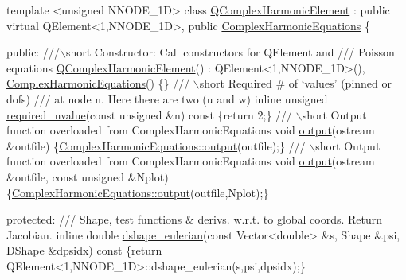 \begin{DoxyCodeInclude}
\textcolor{keyword}{template} <\textcolor{keywordtype}{unsigned} NNODE\_1D>
\textcolor{keyword}{class }\hyperlink{classQComplexHarmonicElement}{QComplexHarmonicElement} : \textcolor{keyword}{public} \textcolor{keyword}{virtual} QElement<1,NNODE\_1D>, 
                         \textcolor{keyword}{public} \hyperlink{classComplexHarmonicEquations}{ComplexHarmonicEquations}
\{
 
  \textcolor{keyword}{public}:
\textcolor{comment}{}
\textcolor{comment}{ ///\(\backslash\)short  Constructor: Call constructors for QElement and }
\textcolor{comment}{ /// Poisson equations}
\textcolor{comment}{} \hyperlink{classQComplexHarmonicElement_a9f1e88c4b5c7031d77c6f6dd3758de2a}{QComplexHarmonicElement}() : QElement<1,NNODE\_1D>(), 
                             \hyperlink{classComplexHarmonicEquations}{ComplexHarmonicEquations}() \{\}
\textcolor{comment}{}
\textcolor{comment}{ /// \(\backslash\)short  Required  # of `values' (pinned or dofs) }
\textcolor{comment}{ /// at node n. Here there are two (u and w)}
\textcolor{comment}{} \textcolor{keyword}{inline} \textcolor{keywordtype}{unsigned} \hyperlink{classQComplexHarmonicElement_a3f1d68324e9d8b9e143044d716c72a87}{required\_nvalue}(\textcolor{keyword}{const} \textcolor{keywordtype}{unsigned} &n)\textcolor{keyword}{ const }\{\textcolor{keywordflow}{return} 2;\}
\textcolor{comment}{}
\textcolor{comment}{ /// \(\backslash\)short Output function overloaded from ComplexHarmonicEquations}
\textcolor{comment}{} \textcolor{keywordtype}{void} \hyperlink{classQComplexHarmonicElement_a8c45d7281a7bc7e2e2d53a7f87339ca4}{output}(ostream &outfile) 
  \{\hyperlink{classComplexHarmonicEquations_a9185e07b984e735c1c45b6f5a6c02b5f}{ComplexHarmonicEquations::output}(outfile);\}
\textcolor{comment}{}
\textcolor{comment}{ ///  \(\backslash\)short Output function overloaded from ComplexHarmonicEquations}
\textcolor{comment}{} \textcolor{keywordtype}{void} \hyperlink{classQComplexHarmonicElement_a8c45d7281a7bc7e2e2d53a7f87339ca4}{output}(ostream &outfile, \textcolor{keyword}{const} \textcolor{keywordtype}{unsigned} &Nplot) 
  \{\hyperlink{classComplexHarmonicEquations_a9185e07b984e735c1c45b6f5a6c02b5f}{ComplexHarmonicEquations::output}(outfile,Nplot);\}


\textcolor{keyword}{protected}:
\textcolor{comment}{}
\textcolor{comment}{/// Shape, test functions & derivs. w.r.t. to global coords. Return Jacobian.}
\textcolor{comment}{} \textcolor{keyword}{inline} \textcolor{keywordtype}{double} \hyperlink{classQComplexHarmonicElement_a7c97d4e8c5433a44640d30c936d69ffb}{dshape\_eulerian}(\textcolor{keyword}{const} Vector<double> &s, 
                               Shape &psi, 
                               DShape &dpsidx)\textcolor{keyword}{ const}
\textcolor{keyword}{  }\{\textcolor{keywordflow}{return} QElement<1,NNODE\_1D>::dshape\_eulerian(s,psi,dpsidx);\}
 

\end{DoxyCodeInclude}
